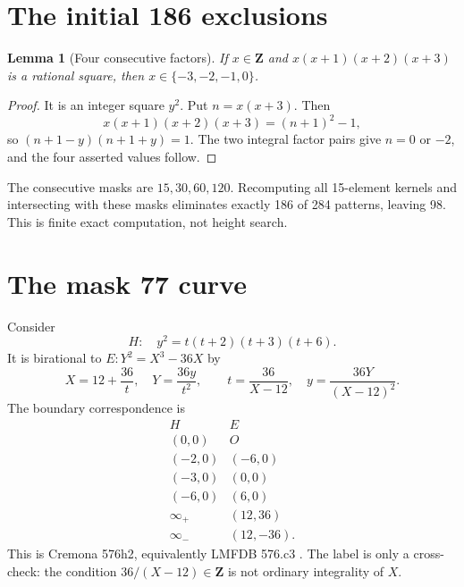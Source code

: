\documentclass[11pt]{article}
\newtheorem{lemma}[theorem]{Lemma}
\begin{document}
\section{The initial 186 exclusions}
\begin{lemma}[Four consecutive factors]\label{lem:four}
If $x\in\mathbf Z$ and $x(x+1)(x+2)(x+3)$ is a rational square, then
$x\in\{-3,-2,-1,0\}$.
\end{lemma}
\begin{proof}
It is an integer square $y^2$. Put $n=x(x+3)$. Then
\[
 x(x+1)(x+2)(x+3)=(n+1)^2-1,
\]
so $(n+1-y)(n+1+y)=1$. The two integral factor pairs give $n=0$ or
$-2$, and the four asserted values follow.
\end{proof}
The consecutive masks are $15,30,60,120$. Recomputing all 15-element
kernels and intersecting with these masks eliminates exactly 186 of 284
patterns, leaving 98. This is finite exact computation, not height search.

\section{The mask 77 curve}
Consider
\[
 H:\quad y^2=t(t+2)(t+3)(t+6).
\]
It is birational to $E:Y^2=X^3-36X$ by
\[
 X=12+\frac{36}{t},\quad Y=\frac{36y}{t^2},\qquad
 t=\frac{36}{X-12},\quad y=\frac{36Y}{(X-12)^2}.
\]
The boundary correspondence is
\[
\begin{array}{c|c}
H&E\\ \hline
(0,0)&O\\ (-2,0)&(-6,0)\\ (-3,0)&(0,0)\\ (-6,0)&(6,0)\\
\infty_+&(12,36)\\ \infty_-&(12,-36).
\end{array}
\]
This is Cremona 576h2, equivalently LMFDB 576.c3
\cite{LMFDB576c3}. The label is only a cross-check: the condition
$36/(X-12)\in\mathbf Z$ is not ordinary integrality of $X$.
\end{document}

